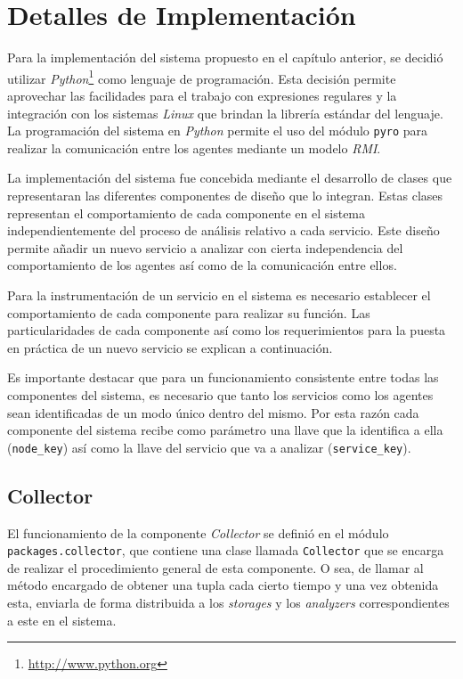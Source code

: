 \chapter{Detalles de Implementación}
  Para la implementación del sistema propuesto en el capítulo anterior, se
decidió utilizar \emph{Python}\footnote{\url{http://www.python.org}} como
lenguaje de programación. Esta decisión permite aprovechar las facilidades para
el trabajo con expresiones regulares y la integración con los sistemas
\emph{Linux} que brindan la librería estándar del lenguaje. La programación del
sistema en \emph{Python} permite el uso del módulo \texttt{pyro} para realizar
la comunicación entre los agentes mediante un modelo \emph{RMI}.

La implementación del sistema fue concebida mediante el desarrollo de clases que
representaran las diferentes componentes de diseño que lo integran. Estas clases
representan el comportamiento de cada componente en el sistema
independientemente del proceso de análisis relativo a cada servicio. Este diseño
permite añadir un nuevo servicio a analizar con cierta independencia del
comportamiento de los agentes así como de la comunicación entre ellos.

Para la instrumentación de un servicio en el sistema es necesario establecer el
comportamiento de cada componente para realizar su función. Las particularidades
de cada componente así como los requerimientos para la puesta en práctica de un
nuevo servicio se explican a continuación.

Es importante destacar que para un funcionamiento consistente entre todas las
componentes del sistema, es necesario que tanto los servicios como los agentes
sean identificadas de un modo único dentro del mismo. Por esta razón cada
componente del sistema recibe como parámetro una llave que la identifica a ella
(\texttt{node\_key}) así como la llave del servicio que va a analizar
(\texttt{service\_key}).

\section{Collector}
El funcionamiento de la componente \textit{Collector} se definió en el módulo
\texttt{packages.collector}, que contiene una clase llamada \texttt{Collector}
que se encarga de realizar el procedimiento general de esta componente. O sea,
de llamar al método encargado de obtener una tupla cada cierto tiempo y una vez
obtenida esta, enviarla de forma distribuida a los \textit{storages} y los
\textit{analyzers} correspondientes a este en el sistema.  

